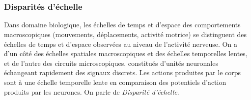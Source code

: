\documentclass[11pt]{article}
\begin{document}
\section{}










\subsubsection{Disparités d'échelle}\label{page:echelle}
Dans domaine biologique, les échelles de temps et d'espace des comportements macroscopiques 
(mouvements, déplacements, activité motrice)  
se distinguent des échelles de temps et d'espace observées au niveau de l'activité
nerveuse.
On a d'un côté des échelles
spatiales macroscopiques et des échelles temporelles lentes, et de l'autre des circuits microscopiques, constitués d'unités neuronales échangeant rapidement des signaux discrets.
Les actions produites par le corps sont à une échelle temporelle lente en comparaison des potentiels d'action
produits par les neurones. On parle de \textit{Disparité d'échelle}.
\end{document}
